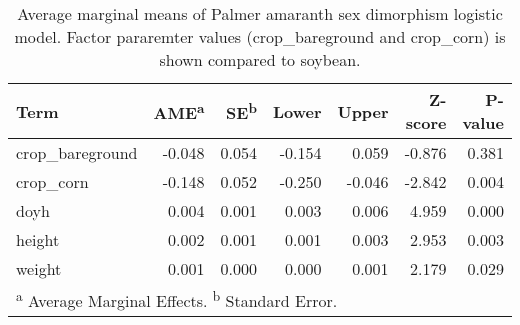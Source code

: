 \begin{table}[!h]

\caption{\label{tab:unnamed-chunk-3}Average marginal means of Palmer amaranth sex dimorphism logistic model. Factor pararemter values (crop\_bareground and crop\_corn) is shown compared to soybean.}
\centering
\fontsize{10}{12}\selectfont
\begin{tabular}[t]{lrrrrrr}
\toprule
Term & AME\textsuperscript{a} & SE\textsuperscript{b} & Lower & Upper & Z-score & P-value\\
\midrule
crop\_bareground & -0.048 & 0.054 & -0.154 & 0.059 & -0.876 & 0.381\\

crop\_corn & -0.148 & 0.052 & -0.250 & -0.046 & -2.842 & 0.004\\

doyh & 0.004 & 0.001 & 0.003 & 0.006 & 4.959 & 0.000\\

height & 0.002 & 0.001 & 0.001 & 0.003 & 2.953 & 0.003\\

weight & 0.001 & 0.000 & 0.000 & 0.001 & 2.179 & 0.029\\
\bottomrule
\multicolumn{7}{l}{\rule{0pt}{1em}\textsuperscript{a} Average Marginal Effects. \textsuperscript{b} Standard Error.}\\
\end{tabular}
\end{table}